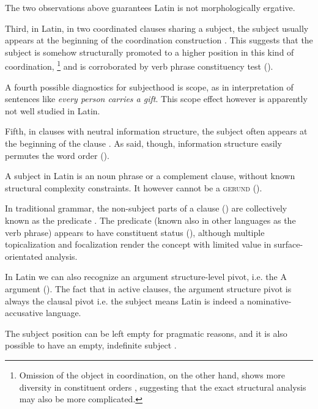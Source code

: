 \documentclass[a4paper, oneside, 12pt]{report}
\newcommand*{\citesec}[1]{\S~{#1}}
\newcommand*{\citepage}[1]{p.~{#1}}
\newcommand{\form}[1]{\emph{#1}}
\newcommand*{\category}[1]{\textsc{#1}}
\begin{document}
The two observations above guarantees Latin is not morphologically ergative.

Third, in Latin, in two coordinated clauses sharing a subject,
the subject usually appears at the beginning of the coordination construction 
\citep[\citesec{19.5}]{pinkster2}.
This suggests that the subject is somehow structurally 
promoted to a higher position in this kind of coordination,%
\footnote{
    Omission of the object in coordination, on the other hand,
    shows more diversity in constituent orders \citep[\citesec{19.6}]{pinkster2},
    suggesting that the exact structural analysis may also be more complicated.
}
and is corroborated by verb phrase constituency test ().

A fourth possible diagnostics for subjecthood is scope, as in interpretation of sentences like \form{every person carries a gift}.
This scope effect however is apparently not well studied in Latin.

Fifth, in clauses with neutral information structure,
the subject often appears at the beginning of the clause \citep[\citepage{79}]{devine2006latin}.
As said, though, information structure easily permutes the word order ().

A subject in Latin is an noun phrase or a complement clause,
without known structural complexity constraints.
It however cannot be a \category{gerund} ().

In traditional grammar, the non-subject parts of a clause () are collectively known as the predicate \citep[\citepage{164}]{allen1903allen}.
The predicate (known also in other languages as the verb phrase) appears to have constituent status (),
although multiple topicalization and focalization render the concept with limited value in surface-orientated analysis.

In Latin we can also recognize an argument structure-level pivot, i.e. the A argument
().
The fact that in active clauses, the argument structure pivot is always the clausal pivot i.e. the subject 
means Latin is indeed a nominative-accusative language.

The subject position can be left empty for pragmatic reasons,
and it is also possible to have an empty, indefinite subject \citep[\citesec{9.9}]{Pinkster1}.
\end{document}
